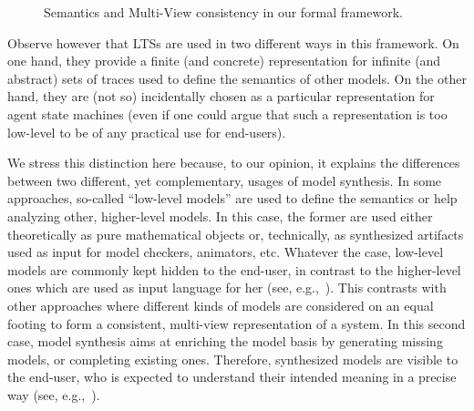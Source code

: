 \begin{figure}[t]\centering
  \caption{Semantics and Multi-View consistency in our formal framework.\label{image:framework}}
\end{figure}

Observe however that LTSs are used in two different ways in this framework. On one hand, they provide a finite (and concrete) representation for infinite (and abstract) sets of traces used to define the semantics of other models. On the other hand, they are (not so) incidentally chosen as a particular representation for agent state machines (even if one could argue that such a representation is too low-level to be of any practical use for end-users). 

We stress this distinction here because, to our opinion, it explains the differences between two different, yet complementary, usages of model synthesis. In some approaches, so-called ``low-level models'' are used to define the semantics or help analyzing other, higher-level models. In this case, the former are used either theoretically as pure mathematical objects or, technically, as synthesized artifacts used as input for model checkers, animators, etc. Whatever the case, low-level models are commonly kept hidden to the end-user, in contrast to the higher-level ones which are used as input language for her (see, e.g.,~\cite{Magee:1997, Uchitel:2003, Damas:2009}). This contrasts with other approaches where different kinds of models are considered on an equal footing to form a consistent, multi-view representation of a system. In this second case, model synthesis aims at enriching the model basis by generating missing models, or completing existing ones. Therefore, synthesized models are visible to the end-user, who is expected to understand their intended meaning in a precise way (see, e.g.,~\cite{VanLamsweerde:1998, Whittle:2000, Uchitel:2004, Damas:2005}).


